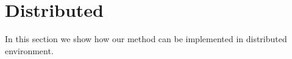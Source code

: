 \section{Distributed}
In this section we show how our method can be implemented in distributed environment.